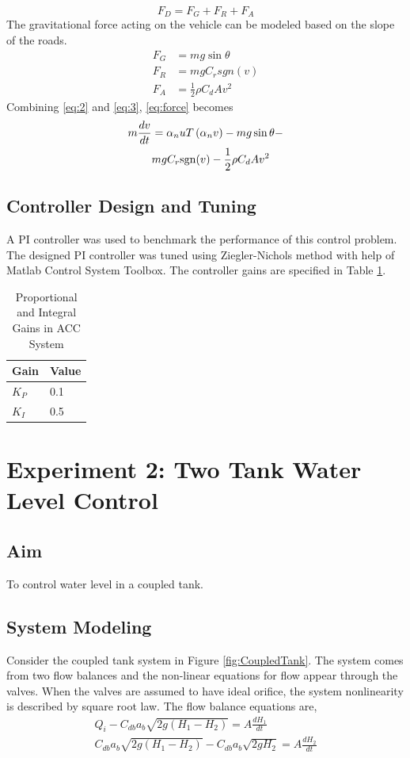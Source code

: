 \begin{equation} \label{eq:2}
{F_D} = {F_G} + {F_R} + {F_A}
\end{equation}
The gravitational force acting on the vehicle can be modeled based on the slope of the roads.
\begin{align} \label{eq:3}
{F_G} &= mg\sin \theta \\
{F_R} &= mgC_r sgn\left(v\right) \\
{F_A} &= \frac{1}{2}\rho {C_d}A{v^2}
\end{align}
Combining \eqref{eq:2} and \eqref{eq:3}, \eqref{eq:force} becomes
\begin{align} \label{eq:Tforce}
m\frac{{dv}}{{dt}} &= {\alpha _n}uT\left( {{\alpha _n}v} \right) -  mg\sin \theta - \\
& mg{C_r}{\mathop{\rm sgn}} ( v ) - \frac{1}{2}\rho {C_d}A{v^2} \nonumber 
\end{align}

\subsection{Controller Design and Tuning}
A PI controller was used to benchmark the performance of this control problem. The designed PI controller was tuned using Ziegler-Nichols method with help of Matlab Control System Toolbox. The controller gains are specified in Table \ref{tab:Gain_ACC}.

\begin{table}[h]
	\centering
	\caption{Proportional and Integral Gains in ACC System}
	\label{tab:Gain_ACC}
	\begin{tabular}{ll} 
		\hline
		Gain & Value \\ \hline
		$ K_P $ & 0.1   \\
		$ K_I $ & 0.5  \\ \hline
	\end{tabular}
\end{table}

\section{Experiment 2: Two Tank Water Level Control \cite{Laubwald2006}}
\subsection{Aim}
To control water level in a coupled tank.
\subsection{System Modeling}
Consider the coupled tank system in Figure \ref{fig:CoupledTank}. The system comes from two flow balances and the non-linear equations for flow appear through the valves. When the valves are assumed to have ideal orifice, the system nonlinearity is described by square root law. The flow balance equations are,
\[\begin{array}{l}
{Q_i} - {C_{db}}{a_b}\sqrt {2g({H_1} - {H_2})}  = A\frac{{d{H_1}}}{{dt}}\\
{C_{db}}{a_b}\sqrt {2g({H_1} - {H_2})}  - {C_{db}}{a_b}\sqrt {2g{H_2}}  = A\frac{{d{H_2}}}{{dt}}
\end{array}\]

